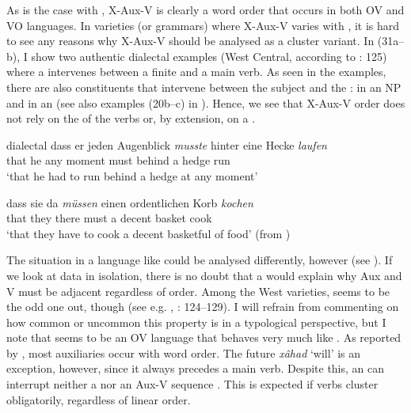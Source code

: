 \documentclass[output=paper, colorlinks, citecolor=brown]{langscibook}
\begin{document}
As is the case with , X-Aux-V is clearly a word order that occurs in both OV and VO languages. In varieties (or grammars) where X-Aux-V varies with , it is hard to see any reasons why X-Aux-V should be analysed as a cluster variant. In (31a–b), I show two authentic dialectal  examples (West Central, according to \citealt{Sapp2011}: 125) where a  intervenes between a finite  and a main verb. As seen in the examples, there are also constituents that intervene between the subject and the : in  an NP  and in  an  (see also examples (20b–c) in ). Hence, we see that X-Aux-V order does not rely on the  of the verbs or, by extension, on a .



\ea dialectal 
\label{ex:sangfelt:31}
\ea\label{ex:sangfelt:31a}
\gll dass er {jeden} {Augenblick} \textit{musste}  {hinter} {eine} {Hecke} \textit{laufen} \\
that he any moment must behind a hedge run\\
\glt ‘that he had to run behind a hedge at any moment’

\ex\label{ex:sangfelt:31b}
\gll dass sie {da} \textit{müssen} {einen} {ordentlichen} {Korb} \textit{kochen}\\
that they there must a decent basket cook\\
\glt ‘that they have to cook a decent basketful of food’ (from \citealt[126]{Sapp2011})\\
\z 
\z 

The situation in a language like  could be analysed differently, however (see ). If we look at  data in isolation, there is no doubt that a  would explain why Aux and V must be adjacent regardless of order. Among the West  varieties,  seems to be the odd one out, though (see e.g. \citealt{Haegeman1992}, \citealt{Sapp2011}: 124–129). I will refrain from commenting on how common or uncommon this property is in a typological perspective, but I note that  seems to be an OV language that behaves very much like . As reported by \citet[100]{Sheehan2017Final}, most  auxiliaries occur with  word order. The future  \textit{xâhad} ‘will’ is an exception, however, since it always precedes a main verb. Despite this, an  can interrupt neither a   nor an Aux-V sequence . This is expected if  verbs cluster obligatorily, regardless of linear order.
\end{document}
